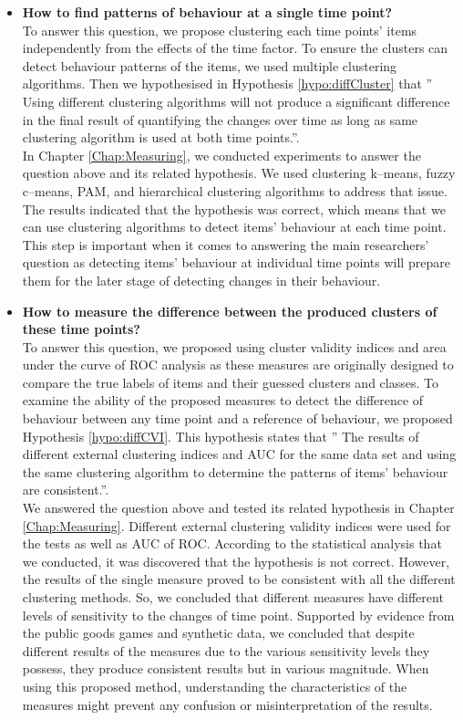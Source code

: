 \begin{itemize}
    
    \item \textbf{How to find patterns of behaviour at a single time point?} \\
    To answer this question, we propose clustering each time points' items independently from the effects of the time factor. To ensure the clusters can detect behaviour patterns of the items, we used multiple clustering algorithms. Then we hypothesised in Hypothesis \ref{hypo:diffCluster} that '' Using different clustering algorithms will not produce a significant difference in the final result of quantifying the changes over time as long as same clustering algorithm is used at both time points.''.  \\
    In Chapter \ref{Chap:Measuring}, we conducted experiments to answer the question above and its related hypothesis. We used clustering k--means, fuzzy c--means, PAM, and hierarchical clustering algorithms to address that issue. The results indicated that the hypothesis was correct, which means that we can use clustering algorithms to detect items' behaviour at each time point. This step is important when it comes to answering the main researchers' question as detecting items' behaviour at individual time points will prepare them for the later stage of detecting changes in their behaviour.
    
    
    
    \item \textbf{How to measure the difference between the produced clusters of these time points?} \\
    To answer this question, we proposed using cluster validity indices and area under the curve of ROC analysis as these measures are originally designed to compare the true labels of items and their guessed clusters and classes. To examine the ability of the proposed measures to detect the difference of behaviour between any time point and a reference of behaviour, we proposed Hypothesis \ref{hypo:diffCVI}. This hypothesis states that '' The results of different external clustering indices and AUC for the same data set and using the same clustering algorithm to determine the patterns of items' behaviour are consistent.''.  \\
    We answered the question above and tested its related hypothesis in Chapter \ref{Chap:Measuring}. Different external clustering validity indices were used for the tests as well as AUC of ROC. According to the statistical analysis that we conducted, it was discovered that the hypothesis is not correct. However, the results of the single measure proved to be consistent with all the different clustering methods. So, we concluded that different measures have different levels of sensitivity to the changes of time point. Supported by evidence from the public goods games and synthetic data, we concluded that despite different results of the measures due to the various sensitivity levels they possess, they produce consistent results but in various magnitude. When using this proposed method, understanding the characteristics of the measures might prevent any confusion or misinterpretation of the results.


\end{itemize}

